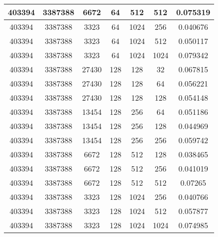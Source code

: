 \documentclass[9pt]{article}
\begin{document}
\begin{tabular}{|c|c|c|c|c|c|c| }
403394  & 3387388  & 6672  & 64  & 512  & 512  & 0.075319 \\
\hline
403394  & 3387388  & 3323  & 64  & 1024  & 256  & 0.040676 \\
\hline
403394  & 3387388  & 3323  & 64  & 1024  & 512  & 0.050117 \\
\hline
403394  & 3387388  & 3323  & 64  & 1024  & 1024  & 0.079342 \\
\hline
403394  & 3387388  & 27430  & 128  & 128  & 32  & 0.067815 \\
\hline
403394  & 3387388  & 27430  & 128  & 128  & 64  & 0.056221 \\
\hline
403394  & 3387388  & 27430  & 128  & 128  & 128  & 0.054148 \\
\hline
403394  & 3387388  & 13454  & 128  & 256  & 64  & 0.051186 \\
\hline
403394  & 3387388  & 13454  & 128  & 256  & 128  & 0.044969 \\
\hline
403394  & 3387388  & 13454  & 128  & 256  & 256  & 0.059742 \\
\hline
403394  & 3387388  & 6672  & 128  & 512  & 128  & 0.038465 \\
\hline
403394  & 3387388  & 6672  & 128  & 512  & 256  & 0.041019 \\
\hline
403394  & 3387388  & 6672  & 128  & 512  & 512  & 0.07265 \\
\hline
403394  & 3387388  & 3323  & 128  & 1024  & 256  & 0.040766 \\
\hline
403394  & 3387388  & 3323  & 128  & 1024  & 512  & 0.057877 \\
\hline
403394  & 3387388  & 3323  & 128  & 1024  & 1024  & 0.074985 \\
\hline
\end{tabular}
 
\end{document}
